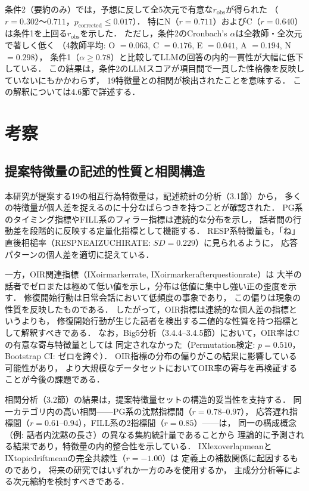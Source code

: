 \documentclass[dvipdfmx,11pt,a4paper]{bxjsarticle}
\renewcommand{\_}{\paperorigunderscore\allowbreak}%
\begin{document}
条件2（要約のみ）では，予想に反して全5次元で有意な$r_{\text{obs}}$が得られた
（$r = 0.302$〜$0.711$，$p_{\text{corrected}} \leq 0.017$）．
特にN（$r = 0.711$）およびC（$r = 0.640$）は条件1を上回る$r_{\text{obs}}$を示した．
ただし，条件2のCronbach's $\alpha$は全教師・全次元で著しく低く
（4教師平均: O $= 0.063$, C $= 0.176$, E $= 0.041$, A $= 0.194$, N $= 0.298$），
条件1（$\alpha \geq 0.78$）と比較してLLMの回答の内的一貫性が大幅に低下している．
この結果は，条件2のLLMスコアが項目間で一貫した性格像を反映していないにもかかわらず，
19特徴量との相関が検出されたことを意味する．
この解釈については4.6節で詳述する．

\section{考察}

\subsection{提案特徴量の記述的性質と相関構造}

本研究が提案する19の相互行為特徴量は，記述統計の分析（3.1節）から，
多くの特徴量が個人差を捉えるのに十分なばらつきを持つことが確認された．
PG系のタイミング指標やFILL系のフィラー指標は連続的な分布を示し，
話者間の行動差を段階的に反映する定量化指標として機能する．
RESP系特徴量も，「ね」直後相槌率（RESP\_NE\_AIZUCHI\_RATE: $SD = 0.229$）に見られるように，
応答パターンの個人差を適切に捉えている．

一方，OIR関連指標（IX\_oirmarker\_rate, IX\_oirmarker\_after\_question\_rate）は
大半の話者でゼロまたは極めて低い値を示し，分布は低値に集中し強い正の歪度を示す．
修復開始行動は日常会話において低頻度の事象であり，
この偏りは現象の性質を反映したものである．
したがって，OIR指標は連続的な個人差の指標というよりも，
修復開始行動が生じた話者を検出する二値的な性質を持つ指標として解釈すべきである．
なお，Big5分析（3.4.4--3.4.5節）において，OIR率はCの有意な寄与特徴量としては
同定されなかった（Permutation検定: $p = 0.510$，Bootstrap CI: ゼロを跨ぐ）．
OIR指標の分布の偏りがこの結果に影響している可能性があり，
より大規模なデータセットにおいてOIR率の寄与を再検証することが今後の課題である．

相関分析（3.2節）の結果は，提案特徴量セットの構造的妥当性を支持する．
同一カテゴリ内の高い相関——PG系の沈黙指標間（$r = 0.78$--$0.97$），
応答遅れ指標間（$r = 0.61$--$0.94$），FILL系の2指標間（$r = 0.85$）——は，
同一の構成概念（例: 話者内沈黙の長さ）の異なる集約統計量であることから
理論的に予測される結果であり，特徴量の内的整合性を示している．
IX\_lex\_overlap\_meanとIX\_topic\_drift\_meanの完全共線性（$r = -1.00$）は
定義上の補数関係に起因するものであり，
将来の研究ではいずれか一方のみを使用するか，
主成分分析等による次元縮約を検討すべきである．
\end{document}
